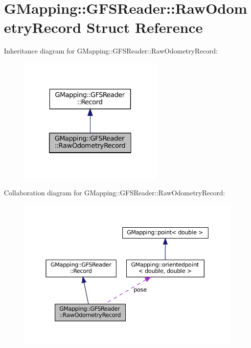 \hypertarget{structGMapping_1_1GFSReader_1_1RawOdometryRecord}{}\section{G\+Mapping\+:\+:G\+F\+S\+Reader\+:\+:Raw\+Odometry\+Record Struct Reference}
\label{structGMapping_1_1GFSReader_1_1RawOdometryRecord}


Inheritance diagram for G\+Mapping\+:\+:G\+F\+S\+Reader\+:\+:Raw\+Odometry\+Record\+:
\nopagebreak
\begin{figure}[H]
\begin{center}
\leavevmode
\includegraphics[width=205pt]{structGMapping_1_1GFSReader_1_1RawOdometryRecord__inherit__graph}
\end{center}
\end{figure}


Collaboration diagram for G\+Mapping\+:\+:G\+F\+S\+Reader\+:\+:Raw\+Odometry\+Record\+:
\nopagebreak
\begin{figure}[H]
\begin{center}
\leavevmode
\includegraphics[width=350pt]{structGMapping_1_1GFSReader_1_1RawOdometryRecord__coll__graph}
\end{center}
\end{figure}
